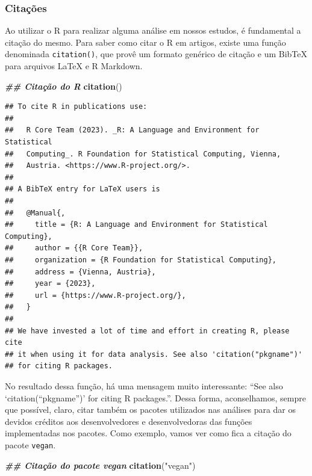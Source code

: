 \documentclass[
]{article}
\newenvironment{Shaded}{\begin{snugshade}}{\end{snugshade}}
\newcommand{\DocumentationTok}[1]{\textcolor[rgb]{0.56,0.35,0.01}{\textbf{\textit{#1}}}}
\newcommand{\FunctionTok}[1]{\textcolor[rgb]{0.13,0.29,0.53}{\textbf{#1}}}
\newcommand{\NormalTok}[1]{#1}
\newcommand{\StringTok}[1]{\textcolor[rgb]{0.31,0.60,0.02}{#1}}
\begin{document}
\hypertarget{citauxe7uxf5es}{%
\subsubsection{Citações}\label{citauxe7uxf5es}}

Ao utilizar o R para realizar alguma análise em nossos estudos, é fundamental a citação do mesmo. Para saber como citar o R em artigos, existe uma função denominada \texttt{citation()}, que provê um formato genérico de citação e um BibTeX para arquivos LaTeX e R Markdown.

\begin{Shaded}
\begin{Highlighting}[]
\DocumentationTok{\#\# Citação do R}
\FunctionTok{citation}\NormalTok{()}
\end{Highlighting}
\end{Shaded}

\begin{verbatim}
## To cite R in publications use:
## 
##   R Core Team (2023). _R: A Language and Environment for Statistical
##   Computing_. R Foundation for Statistical Computing, Vienna,
##   Austria. <https://www.R-project.org/>.
## 
## A BibTeX entry for LaTeX users is
## 
##   @Manual{,
##     title = {R: A Language and Environment for Statistical Computing},
##     author = {{R Core Team}},
##     organization = {R Foundation for Statistical Computing},
##     address = {Vienna, Austria},
##     year = {2023},
##     url = {https://www.R-project.org/},
##   }
## 
## We have invested a lot of time and effort in creating R, please cite
## it when using it for data analysis. See also 'citation("pkgname")'
## for citing R packages.
\end{verbatim}

No resultado dessa função, há uma mensagem muito interessante: ``See also `citation(``pkgname'')' for citing R packages.''. Dessa forma, aconselhamos, sempre que possível, claro, citar também os pacotes utilizados nas análises para dar os devidos créditos aos desenvolvedores e desenvolvedoras das funções implementadas nos pacotes. Como exemplo, vamos ver como fica a citação do pacote \texttt{vegan}.

\begin{Shaded}
\begin{Highlighting}[]
\DocumentationTok{\#\# Citação do pacote vegan}
\FunctionTok{citation}\NormalTok{(}\StringTok{"vegan"}\NormalTok{)}
\end{Highlighting}
\end{Shaded}
\end{document}
